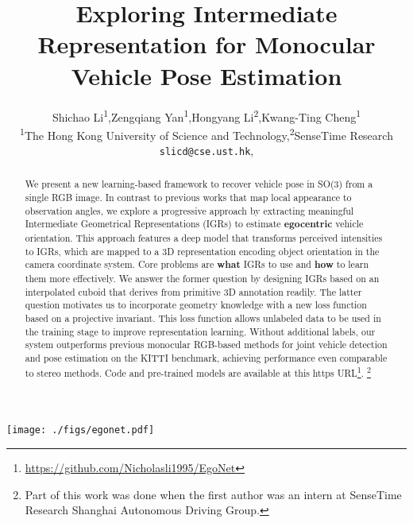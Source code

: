 \documentclass[final]{cvpr}
\title{Exploring Intermediate Representation for Monocular Vehicle Pose Estimation}
\author{Shichao Li\textsuperscript{1},\quad Zengqiang Yan\textsuperscript{1},\quad Hongyang Li\textsuperscript{2},\quad Kwang-Ting Cheng\textsuperscript{1}\\
	\textsuperscript{1}The Hong Kong University of Science and Technology,\quad  \textsuperscript{2}SenseTime Research \\ {\tt\small slicd@cse.ust.hk},
	\quad{\tt\small timcheng@ust.hk}
}
\begin{document}

\begin{abstract}  
We present a new learning-based framework to recover vehicle pose in SO(3) from a single RGB image. In contrast to previous works that map local appearance to observation angles, we explore a progressive approach by extracting meaningful Intermediate Geometrical Representations (IGRs) to estimate \textbf{egocentric} vehicle orientation. This approach features a deep model that transforms perceived intensities to IGRs, which are mapped to a 3D representation encoding object orientation in the camera coordinate system. Core problems are \textbf{what} IGRs to use and \textbf{how} to learn them more effectively. We answer the former question by designing IGRs based on an interpolated cuboid that derives from primitive 3D annotation readily. The latter question motivates us to incorporate geometry knowledge with a new loss function based on a projective invariant. This loss function allows unlabeled data to be used in the training stage to improve representation learning. Without additional labels, our system outperforms previous monocular RGB-based methods for joint vehicle detection and pose estimation on the KITTI benchmark, achieving performance even comparable to stereo methods. Code and pre-trained models are available at this https URL\footnote{\url{https://github.com/Nicholasli1995/EgoNet}}. {\let\thefootnote\relax\footnote{{Part of this work was done when the first author was an intern at SenseTime Research Shanghai Autonomous Driving Group.}}}
\end{abstract}
\begin{figure*}[t]
	\begin{center}
		\texttt{[image: ./figs/egonet.pdf]}
	\end{center}
	\caption{Detailed architecture of Ego-Net. Feature maps are first computed with a fully convolution model $\mathcal{H}$ from a detected instance. Heatmaps representing the projection of a 3D cuboid are regressed and mapped to local coordinates with several strided convolution layers. The local coordinates are transformed to screen coordinates $\phi_g(\mathbf{x}_i)$ and mapped to a 3D cuboid representation $\psi(\mathbf{x}_i)$, whose orientation directly represent egocentric pose in the camera coordinate system. k=33 when q=2 as in Sec. \ref{MA}.}
	\label{fig:egonet}
\end{figure*}
\end{document}
